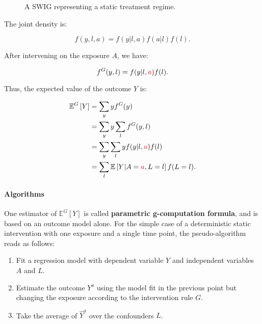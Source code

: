 \documentclass[12pt,twoside]{article}
\begin{document}
\begin{figure}[ht]
\centering
{}
\caption{A SWIG representing a static treatment regime.}
\label{fig:swig_det_stat_inv}
\end{figure}

The joint density is:

\begin{equation}
    f(y,l,a) = f(y|l,a) f(a|l) f(l).
\end{equation}

After intervening on the exposure $A$, we have:

\begin{equation}
    f^G(y,l) = f(y|l,\textcolor{red}{a}) f(l).
\end{equation}

Thus, the expected value of the outcome $Y$ is:

\begin{align}
    \mathbb{E}^G \left[ Y \right] &= \sum_y y f^G(y) \\
    &= \sum_y y \sum_l f^G(y,l) \\
    &= \sum_y \sum_l y f(y|l,\textcolor{red}{a}) f(l) \\
    &= \sum_l \mathbb{E} \left[ Y|A=\textcolor{red}{a},L=l\right] f(L=l).
\end{align}

\paragraph*{Algorithms}
One estimator of $\mathbb{E}^G [Y]$ is called \textbf{parametric g-computation formula}, and is based on an outcome model alone. For the simple case of a deterministic static intervention with one exposure and a single time point, the pseudo-algorithm reads as follows:

\begin{enumerate}
    \item Fit a regression model with dependent variable $Y$ and independent variables $A$ and $L$.
    \item Estimate the outcome $Y^a$ using the model fit in the previous point but changing the exposure according to the intervention rule $G$.
    \item Take the average of $\hat{Y}^a$ over the confounders $L$.
\end{enumerate}
\end{document}

